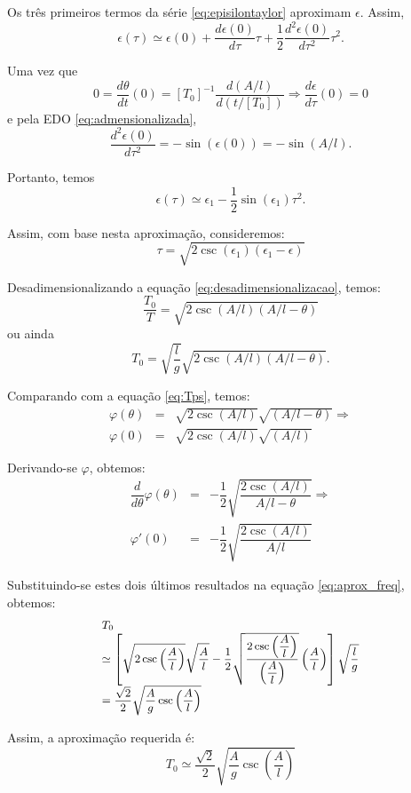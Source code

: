 {    Os três primeiros termos da série \eqref{eq:episilontaylor} aproximam \(\epsilon\). Assim,
    \[
    \epsilon(\tau) \simeq \epsilon(0) + \dfrac{d\epsilon(0)}{d\tau} \tau + \dfrac{1}{2} \dfrac{d^2\epsilon(0)}{d\tau^2} \tau^2.
    \]
    
    Uma vez que 
    \[0 = \dfrac{d\theta}{dt}(0) = [T_0]^{-1} \dfrac{d(A/l)}{d(t/[T_0])} \Rightarrow \dfrac{d\epsilon}{d\tau}(0) = 0\]
    e pela EDO \eqref{eq:admensionalizada},
    \[\dfrac{d^2\epsilon(0)}{d\tau^2} = -\sin(\epsilon(0)) = - \sin(A/l).\]
    
    Portanto, temos
    \[
    \epsilon(\tau) \simeq \epsilon_1 - \dfrac{1}{2} \sin(\epsilon_1)\tau^2.
    \]
    
    Assim, com base nesta aproximação, consideremos:
    \begin{equation}\label{eq:desadimensionalizacao}
    \tau = \sqrt{2 \csc(\epsilon_1)(\epsilon_1 - \epsilon)}
    \end{equation}
    
    
    Desadimensionalizando a equação \eqref{eq:desadimensionalizacao}, temos:
    \begin{equation}\label{eq:desarrumada1}
    \dfrac{T_0}{T} = \sqrt{2 \csc(A/l)(A/l-\theta)}
    \end{equation}
    ou ainda
    \begin{equation}\label{eq:desarrumada2}
    T_0 = \sqrt{\dfrac{l}{g}} \sqrt{2 \csc(A/l) (A/l-\theta)}.
    \end{equation}
    
    Comparando com a equação \eqref{eq:Tps}, temos:
    \[\begin{array}{rcl}
    \varphi(\theta)
    &=& \sqrt{2 \csc(A/l)} \sqrt{(A/l-\theta)}
    \Rightarrow \\
    \varphi(0) &=& \sqrt{2 \csc(A/l)} \sqrt{(A/l)}
    \end{array}\]
    
    Derivando-se \(\varphi\), obtemos:
    \[\begin{array}{rcl}
    \dfrac{d}{d\theta}\varphi(\theta)
    &=& -\dfrac{1}{2}\sqrt{\dfrac{2 \csc(A/l)}{A/l-\theta}}
    \Rightarrow \\
    \varphi'(0) &=& 
    -\dfrac{1}{2}\sqrt{\dfrac{2 \csc(A/l)}{A/l}}
    \end{array}\]
    
    Substituindo-se estes dois últimos resultados na equação \eqref{eq:aprox_freq}, obtemos:
    \[\small
    \begin{array}{l}
    T_{0} \\
    \simeq \left[\sqrt{2 \csc\left(\dfrac{A}{l}\right)} \sqrt{\dfrac{A}{l}} - \dfrac{1}{2}\sqrt{\dfrac{2 \csc\left(\dfrac{A}{l}\right)}{\left(\dfrac{A}{l}\right)}} \left(\dfrac{A}{l}\right)\right] \sqrt{\dfrac{l}{g}} \\
    = \dfrac{\sqrt{2}}{2} \sqrt{\dfrac{A}{g} \csc\left(\dfrac{A}{l}\right)}
    \end{array}
    \]
    
    Assim, a aproximação requerida é:
    \[
    T_{0} \simeq
    \dfrac{\sqrt{2}}{2} \sqrt{\dfrac{A}{g} \csc\left(\dfrac{A}{l}\right)}
    \]
}

